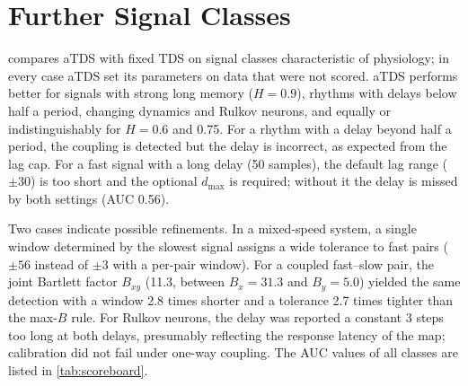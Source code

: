\documentclass[11pt,a4paper]{article}
\begin{document}
\begin{table}[!htbp]
\centering
\caption{Slow-down test: AUC [95\,\% interval] of all settings and parameters chosen. Window / lag / tolerance in samples.}
\label{tab:slowdownfull}
\end{table}

\section{Further Signal Classes}
\label{app:classes}
 compares aTDS with fixed TDS on signal classes characteristic of physiology; in every case aTDS set its parameters on data that were not scored. aTDS performs better for signals with strong long memory ($H = 0.9$), rhythms with delays below half a period, changing dynamics and Rulkov neurons, and equally or indistinguishably for $H = 0.6$ and 0.75. For a rhythm with a delay beyond half a period, the coupling is detected but the delay is incorrect, as expected from the lag cap. For a fast signal with a long delay (50 samples), the default lag range ($\pm30$) is too short and the optional $d_{\max}$ is required; without it the delay is missed by both settings (AUC 0.56).

Two cases indicate possible refinements. In a mixed-speed system, a single window determined by the slowest signal assigns a wide tolerance to fast pairs ($\pm56$ instead of $\pm3$ with a per-pair window). For a coupled fast--slow pair, the joint Bartlett factor $B_{xy}$ (11.3, between $B_x = 31.3$ and $B_y = 5.0$) yielded the same detection with a window 2.8 times shorter and a tolerance 2.7 times tighter than the max-$B$ rule. For Rulkov neurons, the delay was reported a constant 3 steps too long at both delays, presumably reflecting the response latency of the map; calibration did not fail under one-way coupling. The AUC values of all classes are listed in \cref{tab:scoreboard}.
\end{document}

